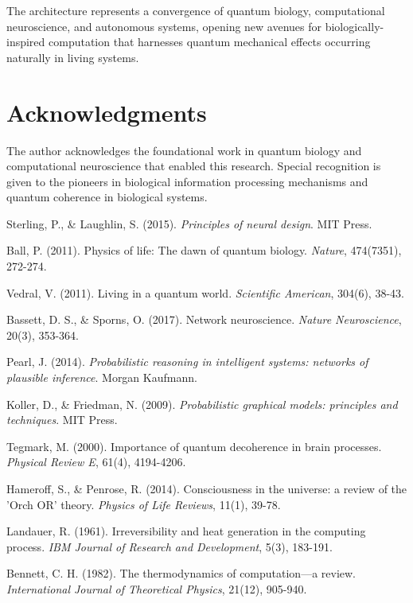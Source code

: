\documentclass[12pt,a4paper]{article}
\begin{document}
The architecture represents a convergence of quantum biology, computational neuroscience, and autonomous systems, opening new avenues for biologically-inspired computation that harnesses quantum mechanical effects occurring naturally in living systems.

\section*{Acknowledgments}

The author acknowledges the foundational work in quantum biology and computational neuroscience that enabled this research. Special recognition is given to the pioneers in biological information processing mechanisms and quantum coherence in biological systems.


\begin{thebibliography}{20}

Sterling, P., \& Laughlin, S. (2015). \textit{Principles of neural design}. MIT Press.

Ball, P. (2011). Physics of life: The dawn of quantum biology. \textit{Nature}, 474(7351), 272-274.

Vedral, V. (2011). Living in a quantum world. \textit{Scientific American}, 304(6), 38-43.

Bassett, D. S., \& Sporns, O. (2017). Network neuroscience. \textit{Nature Neuroscience}, 20(3), 353-364.

Pearl, J. (2014). \textit{Probabilistic reasoning in intelligent systems: networks of plausible inference}. Morgan Kaufmann.

Koller, D., \& Friedman, N. (2009). \textit{Probabilistic graphical models: principles and techniques}. MIT Press.

Tegmark, M. (2000). Importance of quantum decoherence in brain processes. \textit{Physical Review E}, 61(4), 4194-4206.

Hameroff, S., \& Penrose, R. (2014). Consciousness in the universe: a review of the 'Orch OR' theory. \textit{Physics of Life Reviews}, 11(1), 39-78.

Landauer, R. (1961). Irreversibility and heat generation in the computing process. \textit{IBM Journal of Research and Development}, 5(3), 183-191.

Bennett, C. H. (1982). The thermodynamics of computation—a review. \textit{International Journal of Theoretical Physics}, 21(12), 905-940.


\end{thebibliography}
\end{document}
